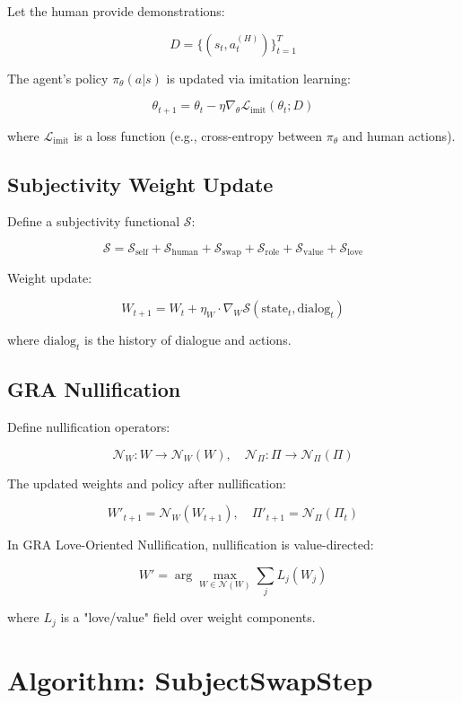 \documentclass[11pt,a4paper]{article}
\begin{document}
Let the human provide demonstrations:

\[
D = \{(s_t, a_t^{(H)})\}_{t=1}^T
\]

The agent's policy \(\pi_\theta(a|s)\) is updated via imitation learning:

\[
\theta_{t+1} = \theta_t - \eta \nabla_\theta \mathcal{L}_{\text{imit}}(\theta_t; D)
\]

where \(\mathcal{L}_{\text{imit}}\) is a loss function (e.g., cross-entropy between \(\pi_\theta\) and human actions).

\subsection{Subjectivity Weight Update}

Define a subjectivity functional \(\mathcal{S}\):

\[
\mathcal{S} = \mathcal{S}_{\text{self}} + \mathcal{S}_{\text{human}} + \mathcal{S}_{\text{swap}} + \mathcal{S}_{\text{role}} + \mathcal{S}_{\text{value}} + \mathcal{S}_{\text{love}}
\]

Weight update:

\[
W_{t+1} = W_t + \eta_W \cdot \nabla_W \mathcal{S}(\text{state}_t, \text{dialog}_t)
\]

where \(\text{dialog}_t\) is the history of dialogue and actions.

\subsection{GRA Nullification}

Define nullification operators:

\[
\mathcal{N}_W: W \to \mathcal{N}_W(W), \quad
\mathcal{N}_\Pi: \Pi \to \mathcal{N}_\Pi(\Pi)
\]

The updated weights and policy after nullification:

\[
W'_{t+1} = \mathcal{N}_W(W_{t+1}), \quad
\Pi'_{t+1} = \mathcal{N}_\Pi(\Pi_t)
\]

In GRA Love-Oriented Nullification, nullification is value-directed:

\[
W' = \arg\max_{W \in \mathcal{N}(W)} \sum_j L_j(W_j)
\]

where \(L_j\) is a "love/value" field over weight components.

\section{Algorithm: SubjectSwapStep}
\end{document}
